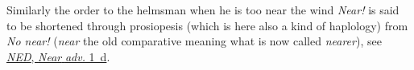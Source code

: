 \noindent Similarly the order to the helmsman when he is too near the wind \textit{Near!} is said to be shortened through prosiopesis (which is here also a kind of haplology) from \textit{No near!} (\textit{near} the old comparative meaning what is now called \textit{nearer}), see \href{https://archive.org/details/oed6barch/page/n887/mode/2up?view=theater}{\textit{NED}, \textit{Near} \textit{adv.} 1~d}. %

